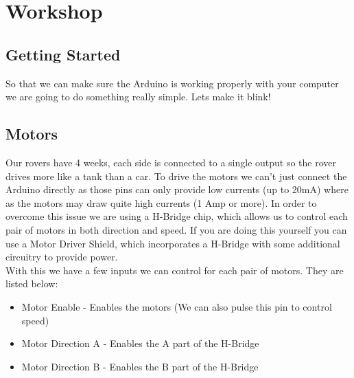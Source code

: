 \section{Workshop}
\subsection{Getting Started}
So that we can make sure the Arduino is working properly with your computer we are going to do something really simple. Lets make it blink!\\


\subsection{Motors}
Our rovers have 4 weeks, each side is connected to a single output so the rover drives more like a tank than a car. To drive the motors we can't just connect the Arduino directly as those pins can only provide low currents (up to 20mA) where as the motors may draw quite high currents (1 Amp or more). In order to overcome this issue we are using a H-Bridge chip, which allows us to control each pair of motors in both direction and speed. If you are doing this yourself you can use a Motor Driver Shield, which incorporates a H-Bridge with some additional circuitry to provide power.\\


With this we have a few inputs we can control for each pair of motors. They are listed below:

\begin{itemize}
	\item Motor Enable - Enables the motors (We can also pulse this pin to control speed)
	\item Motor Direction A - Enables the A part of the H-Bridge
	\item Motor Direction B - Enables the B part of the H-Bridge
\end{itemize}

\newpage